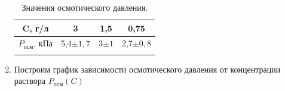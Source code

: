 \documentclass[a4paper, 12pt]{article}%
\begin{document}
\begin{enumerate}
	
	\begin{figure}[H]
	\end{figure}


	
	\begin{longtable}{|c|c|c|c|}
		\hline
	C, г/л	&  3  &  1,5 &  0,75 \\ \hline
	$P_{\text{осм}}$, кПа & 5,4$\pm 1,7$ & 3$\pm 1$& 2,7$\pm 0,8$ \\ \hline
	\caption{Значения осмотического давления.}
	\end{longtable}



\item Построим график зависимости осмотического давления от концентрации раствора 	$P_{\text{осм}}(C)$

\begin{figure}[H]
\end{figure}


\end{enumerate}
\end{document}
